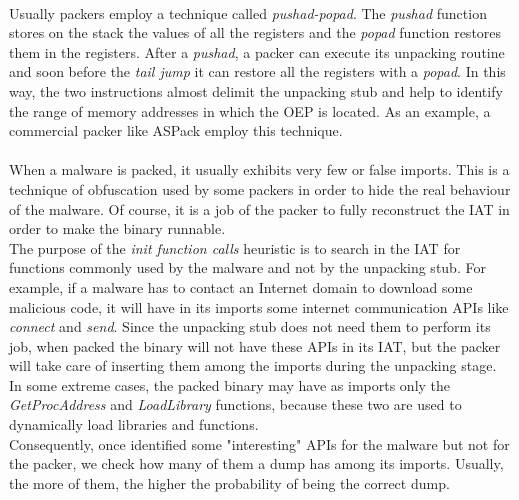 \paragraph{}
Usually packers employ a technique called \textit{pushad-popad}. The \textit{pushad} function stores on the stack the values of all the registers and the \textit{popad} function restores them in the registers. After a \textit{pushad}, a packer can execute its unpacking routine and soon before the \textit{tail jump} it can restore all the registers with a \textit{popad}. In this way, the two instructions almost delimit the unpacking stub and help to identify the range of memory addresses in which the OEP is located. As an example, a commercial packer like ASPack employ this technique.
\paragraph{}
When a malware is packed, it usually exhibits very few or false imports. This is a technique of obfuscation used by some packers in order to hide the real behaviour of the malware. Of course, it is a job of the packer to fully reconstruct the IAT in order to make the binary runnable.\\
The purpose of the \textit{init function calls} heuristic is to search in the IAT for functions commonly used by the malware and not by the unpacking stub. For example, if a malware has to contact an Internet domain to download some malicious code, it will have in its imports some internet communication APIs like \textit{connect} and \textit{send}. Since the unpacking stub does not need them to perform its job, when packed the binary will not have these APIs in its IAT, but the packer will take care of inserting them among the imports during the unpacking stage. In some extreme cases, the packed binary may have as imports only the \textit{GetProcAddress} and \textit{LoadLibrary} functions, because these two are used to dynamically load libraries and functions.\\
Consequently, once identified some "interesting" APIs for the malware but not for the packer, we check how many of them a dump has among its imports. Usually, the more of them, the higher the probability of being the correct dump.